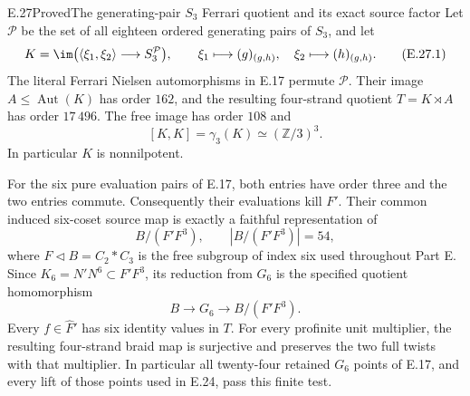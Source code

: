 \begin{statement}{E.27}{Proved}{The generating-pair \texorpdfstring{$S_3$}{S3} Ferrari quotient and its exact source factor}
Let $\mathcal P$ be the set of all eighteen ordered generating pairs of
$S_3$, and let
\[
 K=\im\bigl(\langle\xi_1,\xi_2\rangle\longrightarrow S_3^{\mathcal P}\bigr),
 \qquad \xi_1\longmapsto(g)_{(g,h)},\quad
 \xi_2\longmapsto(h)_{(g,h)}.
 \tag{E.27.1}
\]
The literal Ferrari Nielsen automorphisms in E.17 permute $\mathcal P$.
Their image $A\leq\operatorname{Aut}(K)$ has order $162$, and the resulting
four-strand quotient $T=K\rtimes A$ has order $17\,496$.
The free image has order $108$ and
\[
 [K,K]=\gamma_3(K)\simeq(\mathbb Z/3)^3.
 \tag{E.27.2}
\]
In particular $K$ is nonnilpotent.

For the six pure evaluation pairs of E.17, both entries have order
three and the two entries commute. Consequently their evaluations
kill $F'$. Their common induced six-coset source map is exactly a
faithful representation of
\[
 B/(F'F^3),\qquad |B/(F'F^3)|=54,
 \tag{E.27.3}
\]
where $F\triangleleft B=C_2*C_3$ is the free subgroup of index six
used throughout Part E. Since $K_6=N'N^6\subset F'F^3$, its reduction
from $G_6$ is the specified quotient homomorphism
\[
 B\longrightarrow G_6\longrightarrow B/(F'F^3).
 \tag{E.27.4}
\]
Every $f\in\widehat F'$ has six identity values in $T$. For every
profinite unit multiplier, the resulting four-strand braid map is
surjective and preserves the two full twists with that multiplier.
In particular all twenty-four retained $G_6$ points of E.17, and
every lift of those points used in E.24, pass this finite test.
\end{statement}

